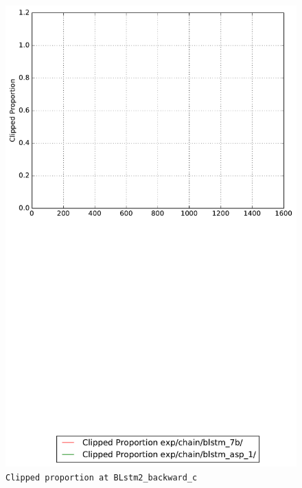 \documentclass[prl,10pt,twocolumn]{revtex4}
\begin{document}
\newpage
\begin{figure}[h]
  \begin{center}
    \caption{\texttt{Clipped proportion at BLstm2\_backward\_c}}
    \includegraphics[width=\textwidth]{exp/chain/blstm_7b/report/clipped_proportion_BLstm2_backward_c.pdf}
  \end{center}
\end{figure}
\clearpage
\end{document}
